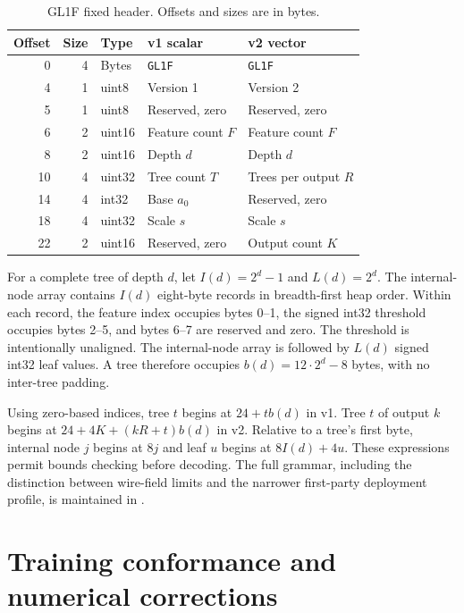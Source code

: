 \documentclass[10pt,a4paper]{article}
\theoremstyle{remark}
\begin{document}
\begin{table}[htbp]
\centering
\small
\caption{GL1F fixed header. Offsets and sizes are in bytes.}
\label{tab:supp-header}
\begin{tabularx}{\linewidth}{rrlXX}
\toprule
Offset & Size & Type & v1 scalar & v2 vector\\
\midrule
0  & 4 & Bytes & \texttt{GL1F} & \texttt{GL1F}\\
4  & 1 & uint8 & Version 1 & Version 2\\
5  & 1 & uint8 & Reserved, zero & Reserved, zero\\
6  & 2 & uint16 & Feature count $F$ & Feature count $F$\\
8  & 2 & uint16 & Depth $d$ & Depth $d$\\
10 & 4 & uint32 & Tree count $T$ & Trees per output $R$\\
14 & 4 & int32 & Base $a_0$ & Reserved, zero\\
18 & 4 & uint32 & Scale $s$ & Scale $s$\\
22 & 2 & uint16 & Reserved, zero & Output count $K$\\
\bottomrule
\end{tabularx}
\end{table}

For a complete tree of depth $d$, let $I(d)=2^d-1$ and $L(d)=2^d$.
The internal-node array contains $I(d)$ eight-byte records in breadth-first
heap order. Within each record, the feature index occupies bytes 0--1, the
signed int32 threshold occupies bytes 2--5, and bytes 6--7 are reserved and
zero. The threshold is intentionally unaligned. The internal-node array is
followed by $L(d)$ signed int32 leaf values. A tree therefore occupies
$b(d)=12\cdot2^d-8$ bytes, with no inter-tree padding.

Using zero-based indices, tree $t$ begins at $24+tb(d)$ in v1. Tree $t$ of
output $k$ begins at $24+4K+(kR+t)b(d)$ in v2. Relative to a tree's first
byte, internal node $j$ begins at $8j$ and leaf $u$ begins at $8I(d)+4u$.
These expressions permit bounds checking before decoding. The full grammar,
including the distinction between wire-field limits and the narrower
first-party deployment profile, is maintained in .



\section{Training conformance and numerical corrections}
\label{sec:supp-training}
\end{document}
